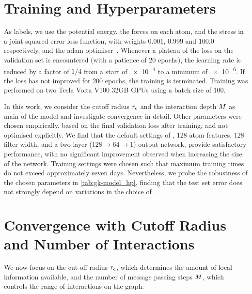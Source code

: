 \section{Training and Hyperparameters}

As labels, we use the potential energy, the forces on each atom, and the stress in a joint squared error loss function, with weights \num{0.001}, \num{0.999} and \num{100.0} respectively, and the \gls{adam} optimiser~\cite{kb2014m}. Whenever a plateau of the loss on the validation set is encountered (with a patience of $20$ epochs), the learning rate is reduced by a factor of $1/4$ from a start of \num{e-4} to a minimum of \num{e-6}. If the loss has not improved for \num{200} epochs, the training is terminated.
Training was performed on two Tesla Volta V100 32GB GPUs using a batch size of \num{100}. 

\begin{table}
    
    \label{tab:gk-model_hp}
\end{table}


In this work, we consider the cutoff radius $r_{\text{c}}$ and the interaction depth $M$ as main \hps of the model and investigate convergence in detail. Other parameters were chosen empirically, based on the final validation loss after training, and not optimised explicitly. We find that the default settings of \schnet, \num{128} atom features, \num{128} filter width, and a two-layer ($128 \rightarrow 64 \rightarrow 1$) output network, provide satisfactory performance, with no significant improvement observed when increasing the size of the network. Training settings were chosen such that maximum training times do not exceed approximately seven days.
Nevertheless, we probe the robustness of the chosen parameters in \cref{tab:gk-model_hp}, finding that the test set error does not strongly depend on variations in the choice of \hps.

\section[Convergence]{Convergence with Cutoff Radius and Number of Interactions}


We now focus on the cut-off radius $r_{\text{c}}$, which determines the amount of local information available, and the number of message passing steps $M$, which controls the range of interactions on the graph.


